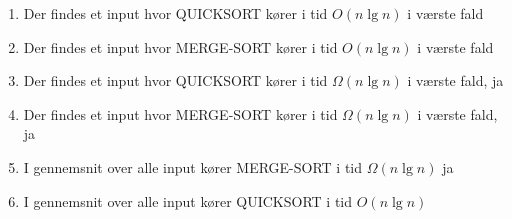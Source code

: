 \documentclass{article}
\theoremstyle{definition}
\begin{document}
\begin{enumerate}
    \item Der findes et input hvor QUICKSORT kører i tid $O(n \lg n)$ i værste fald
    \item Der findes et input hvor MERGE-SORT kører i tid $O(n \lg n)$ i værste fald
    \item Der findes et input hvor QUICKSORT kører i tid $\Omega(n \lg n)$ i værste fald, ja
    \item Der findes et input hvor MERGE-SORT kører i tid $\Omega(n \lg n)$ i værste fald, ja
    \item I gennemsnit over alle input kører MERGE-SORT i tid $\Omega(n \lg n)$ ja
    \item I gennemsnit over alle input kører QUICKSORT i tid $O(n \lg n)$
\end{enumerate}



\end{document}
